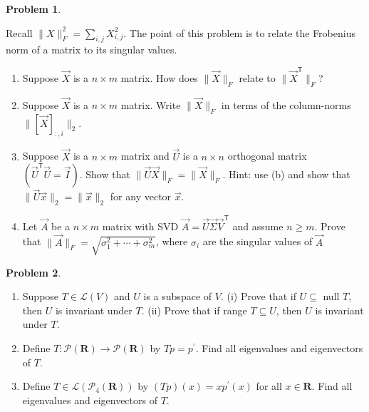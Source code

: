 \documentclass[12pt]{article}
\theoremstyle{definition}
\newtheorem{problem}{Problem}
\newcommand{\T}{\mathsf{T}}
\begin{document}
\begin{problem}~

    Recall $\|X\|_F^2= \sum_{i,j} X_{i,j}^2$. The point of this problem is to relate the Frobenius norm of a matrix to its singular values.

    \begin{enumerate}
        \item 
            Suppose $\vec{X}$ is a $n\times m$ matrix. 
            How does $\|\vec{X}\|_F$ relate to $\|\vec{X}^\T\|_F$?
        \item 
            Suppose $\vec{X}$ is a $n\times m$ matrix. 
            Write $\|\vec{X}\|_F$ in terms of the column-norms $\|[\vec{X}]_{:,i}\|_2$.
        \item Suppose $\vec{X}$ is a $n\times m$ matrix and $\vec{U}$ is a $n\times n$ orthogonal matrix $(\vec{U}^\T \vec{U} = \vec{I})$.
            Show that $\|\vec{U} \vec{X}\|_F = \| \vec{X} \|_F$. 
            Hint: use (b) and show that $\|\vec{U} \vec{x}\|_2 = \|\vec{x}\|_2$ for any vector $\vec{x}$.
        \item Let $\vec{A}$ be a $n\times m$ matrix with SVD $\vec{A} = \vec{U}\vec{\Sigma}\vec{V}^\T$ and assume $n\geq m$.
            Prove that $\|\vec{A}\|_F = \sqrt{\sigma_1^2 + \cdots + \sigma_m^2}$, where $\sigma_i$ are the singular values of $\vec{A}$
    \end{enumerate}
\end{problem}

\begin{problem}~
    \begin{enumerate}
        \item Suppose $T \in \mathcal{L}(V)$ and $U$ is a subspace of $V$.
        (i) Prove that if $U \subseteq$ null $T$, then $U$ is invariant under $T$.
        (ii) Prove that if range $T \subseteq U$, then $U$ is invariant under $T$.
    \item Define $T: \mathcal{P}(\mathbf{R}) \rightarrow \mathcal{P}(\mathbf{R})$ by $T p=p^{\prime}$. Find all eigenvalues and eigenvectors of $T$.
    \item Define $T \in \mathcal{L}\left(\mathcal{P}_4(\mathbf{R})\right)$ by $(T p)(x)=x p^{\prime}(x)$ for all $x \in \mathbf{R}$. Find all eigenvalues and eigenvectors of $T$.
    \end{enumerate}
\end{problem}
\end{document}
